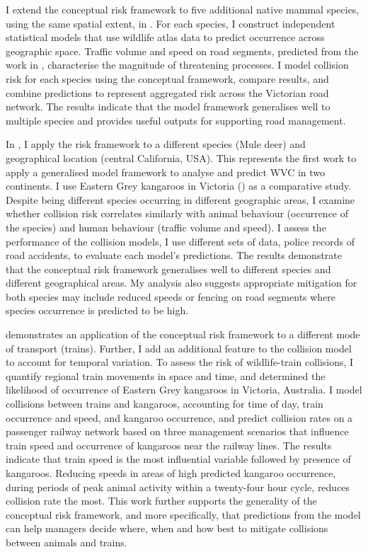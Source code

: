 \documentclass[titlesmallcaps,copyrightpage,examinerscopy]{uomthesis}
\begin{document}
I extend the conceptual risk framework to five additional native mammal species, using the same spatial extent, in . For each species, I construct independent statistical models that use wildlife atlas data to predict occurrence across geographic space. Traffic volume and speed on road segments, predicted from the work in , characterise the magnitude of threatening processes. I model collision risk for each species using the conceptual framework, compare results, and combine predictions to represent aggregated risk across the Victorian road network. The results indicate that the model framework generalises well to multiple species and provides useful outputs for supporting road management. 

In , I apply the risk framework to a different species (Mule deer) and geographical location (central California, USA). This represents the first work to apply a generalised model framework to analyse and predict WVC in two continents. I use Eastern Grey kangaroos in Victoria () as a comparative study. Despite being different species occurring in different geographic areas, I examine whether collision risk correlates similarly with animal behaviour (occurrence of the species) and human behaviour (traffic volume and speed). I assess the performance of the collision models, I use different sets of data, police records of road accidents, to evaluate each model's predictions. The results demonstrate that the conceptual risk framework generalises well to different species and different geographical areas. My analysis also suggests appropriate mitigation for both species may include reduced speeds or fencing on road segments where species occurrence is predicted to be high.

 demonstrates an application of the conceptual risk framework to a different mode of transport (trains). Further, I add an additional feature to the collision model to account for temporal variation. To assess the risk of wildlife-train collisions, I quantify regional train movements in space and time, and determined the likelihood of occurrence of Eastern Grey kangaroos in Victoria, Australia. I model collisions between trains and kangaroos, accounting for time of day, train occurrence and speed, and kangaroo occurrence, and predict collision rates on a passenger railway network based on three management scenarios that influence train speed and occurrence of kangaroos near the railway lines. The results indicate that train speed is the most influential variable followed by presence of kangaroos.  Reducing speeds in areas of high predicted kangaroo occurrence, during periods of peak animal activity within a twenty-four hour cycle, reduces collision rate the most. This work further supports the generality of the conceptual risk framework, and more specifically, that predictions from the model can help managers decide where, when and how best to mitigate collisions between animals and trains.
\end{document}
